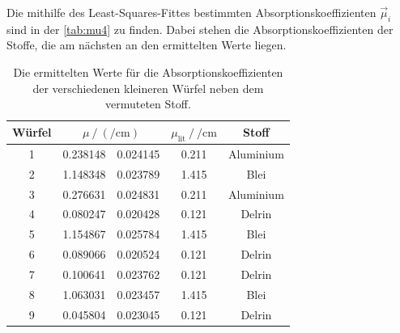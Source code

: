   \noindent Die mithilfe des Least-Squares-Fittes bestimmten Absorptionskoeffizienten $\vec{\mu}_i$ sind in der \autoref{tab:mu4} zu finden. 
  Dabei stehen die Absorptionskoeffizienten der Stoffe, die am nächsten an den ermittelten Werte liegen. 

  \begin{table}[H]
    \centering
    \caption{Die ermittelten Werte für die Absorptionskoeffizienten der verschiedenen kleineren Würfel neben dem vermuteten Stoff.}
    \label{tab:mu4}
    \begin{tabular}{c S[table-format=1.6] @{${}\pm{}$} S[table-format=1.6] S[table-format=1.6] c}
      \toprule
      {Würfel} &  & {$\mu_{\text{lit}} \mathbin{/} \si{\per\centi\metre}$} & {Stoff} \\
       & 0.238148 & 0.024145 & 0.211 & Aluminium \\
      2 & 1.148348 & 0.023789 & 1.415 & Blei \\
      3 & 0.276631 & 0.024831 & 0.211 & Aluminium \\
      4 & 0.080247 & 0.020428 & 0.121 & Delrin \\
      5 & 1.154867 & 0.025784 & 1.415 & Blei \\
      6 & 0.089066 & 0.020524 & 0.121 & Delrin \\
      7 & 0.100641 & 0.023762 & 0.121 & Delrin \\
      8 & 1.063031 & 0.023457 & 1.415 & Blei \\
      9 & 0.045804 & 0.023045 & 0.121 & Delrin \\
      \bottomrule
    \end{tabular}
  \end{table}

